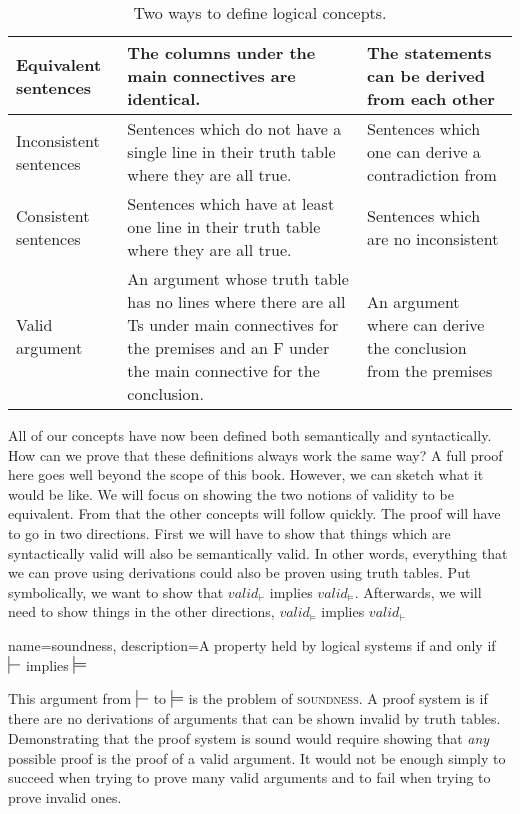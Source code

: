 {\begin{sidewaystable}
\begin{mdframed}[style=mytablebox]
\begin{tabu}{X[.5,c,m] ||X[1,l,m] |X[1,l,m]}
Equivalent sentences &	The columns under the main connectives are identical.& The statements can be derived from each other	\\ \hline

Inconsistent sentences	&	Sentences which do not have a single line in their truth table where they are all true.	& Sentences which one can derive a contradiction from \\ \hline

Consistent sentences	&	Sentences which have at least one line in their truth table where they are all true. & Sentences which are no inconsistent	\\ \hline

Valid argument		&	An argument whose truth table has no lines where there are all Ts under main connectives for the premises and an F under the main connective for the conclusion.  & An argument where can derive the conclusion from the premises	\\ 
\end{tabu}
\end{mdframed}
\caption{Two ways to define logical concepts.}
\label{table:truth_tables_or_derivations}
\end{sidewaystable}

All of our concepts have now been defined both semantically and syntactically. How can we prove that these definitions always work the same way? A full proof here goes well beyond the scope of this book. However, we can sketch what it would be like. We will focus on showing the two notions of validity to be equivalent.  From that the other concepts will follow quickly. The proof will have to go in two directions. First we will have to show that things which are syntactically valid will also be semantically valid. In other words, everything that we can prove using derivations could also be proven using truth tables. Put symbolically, we want to show that $valid_{\vdash}$ implies $valid_{\models}$. Afterwards, we will need to show things in the other directions,  $valid_{\models}$ implies $valid_{\vdash}$

{
name=soundness,
description={A property held by logical systems if and only if $\sststile{}{}$ implies $\sdtstile{}{}$}
}

This argument from $\sststile{}{}$ to $\sdtstile{}{}$ is the problem of \textsc{\gls{soundness}}. \label{def:soundness} A proof system is  if there are no derivations of arguments that can be shown invalid by truth tables. \label{def_Soundness} Demonstrating that the proof system is sound would require showing that \emph{any} possible proof is the proof of a valid argument. It would not be enough simply to succeed when trying to prove many valid arguments and to fail when trying to prove invalid ones.

}
